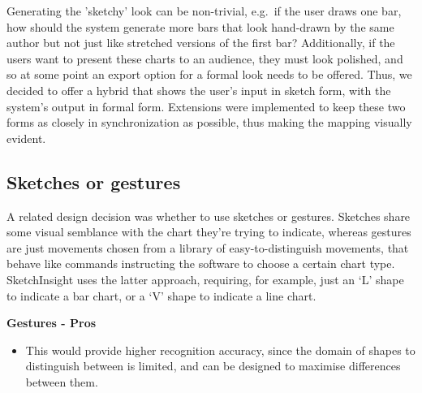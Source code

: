 	Generating the 'sketchy' look can be non-trivial, \citep{plimmer_sketchnode:_2010, wang_sketchset:_2011} e.g.\ if the user draws one bar, how should the system generate more bars that look hand-drawn by the same author but not just like stretched versions of the first bar? Additionally, if the users want to present these charts to an audience, they must look polished, and so at some point an export option for a formal look needs to be offered. Thus, we decided to offer a hybrid that shows the user's input in sketch form, with the system's output in formal form. Extensions were implemented to keep these two forms as closely in synchronization as possible, thus making the mapping visually evident.
	
	\subsection{Sketches or gestures}
	A related design decision was whether to use sketches or gestures. Sketches share some visual semblance with the chart they're trying to indicate, whereas gestures are just movements chosen from a library of easy-to-distinguish movements, that behave like commands instructing the software to choose a certain chart type. SketchInsight \citep{walny_understanding_2012} uses the latter approach, requiring, for example, just an `L' shape to indicate a bar chart, or a `V' shape to indicate a line chart. 
	
		
			\textbf{Gestures - Pros}
			\begin{itemize}
			\item This would provide higher recognition accuracy, since the domain of shapes to distinguish between is limited, and can be designed to maximise differences between them. 
			\end{itemize}
			
